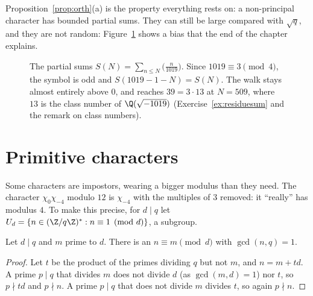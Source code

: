 Proposition~\ref{prop:orth}(a) is the property everything rests on: a non-principal character has bounded partial sums. They can still be
large compared with $\sqrt q$, and they are not random: Figure~\ref{fig:charsums} shows a bias that the end of the chapter explains.

\begin{figure}[ht]
\centering
{}
\caption{The partial sums $S(N)=\sum_{n\le N}\bigl(\frac n{1019}\bigr)$. Since $1019\equiv3\pmod4$, the symbol is odd and $S(1019-1-N)=S(N)$. The walk stays
almost entirely above $0$, and reaches $39=3\cdot13$ at $N=509$, where $13$ is the class number of $\Q(\sqrt{-1019})$
(Exercise~\ref{ex:residuesum} and the remark on class numbers).}
\label{fig:charsums}
\end{figure}

\section{Primitive characters}

Some characters are impostors, wearing a bigger modulus than they need. The character $\chi_0\chi_{-4}$ modulo $12$ is $\chi_{-4}$ with the multiples of $3$ removed: it ``really'' has modulus $4$. To make this precise, for
$d\mid q$ let $U_d=\{n\in(\Z/q\Z)^*:n\equiv1\pmod d\}$, a subgroup.

\begin{lemma}\label{lem:lift}
Let $d\mid q$ and $m$ prime to $d$. There is an $n\equiv m\pmod d$ with $\gcd(n,q)=1$.
\end{lemma}
\begin{proof}
Let $t$ be the product of the primes dividing $q$ but not $m$, and $n=m+td$. A prime $p\mid q$ that divides $m$ does not divide $d$ (as
$\gcd(m,d)=1$) nor $t$, so $p\nmid td$ and $p\nmid n$. A prime $p\mid q$ that does not divide $m$ divides $t$, so again $p\nmid n$.
\end{proof}

